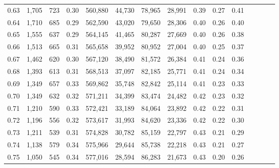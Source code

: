 \begin{tabular}{rrrcrrrrrrrrrrr}
0.63 &   1,705 &     723 &                                       0.30 &  560,880 &   44,730 &   78,965 &   28,991 &  0.39 &  0.27 &                         0.41 \\
0.64 &   1,710 &     685 &                                       0.29 &  562,590 &   43,020 &   79,650 &   28,306 &  0.40 &  0.26 &                         0.40 \\
0.65 &   1,555 &     637 &                                       0.29 &  564,145 &   41,465 &   80,287 &   27,669 &  0.40 &  0.26 &                         0.38 \\
0.66 &   1,513 &     665 &                                       0.31 &  565,658 &   39,952 &   80,952 &   27,004 &  0.40 &  0.25 &                         0.37 \\
0.67 &   1,462 &     620 &                                       0.30 &  567,120 &   38,490 &   81,572 &   26,384 &  0.41 &  0.24 &                         0.36 \\
0.68 &   1,393 &     613 &                                       0.31 &  568,513 &   37,097 &   82,185 &   25,771 &  0.41 &  0.24 &                         0.34 \\
0.69 &   1,349 &     657 &                                       0.33 &  569,862 &   35,748 &   82,842 &   25,114 &  0.41 &  0.23 &                         0.33 \\
0.70 &   1,349 &     632 &                                       0.32 &  571,211 &   34,399 &   83,474 &   24,482 &  0.42 &  0.23 &                         0.32 \\
0.71 &   1,210 &     590 &                                       0.33 &  572,421 &   33,189 &   84,064 &   23,892 &  0.42 &  0.22 &                         0.31 \\
0.72 &   1,196 &     556 &                                       0.32 &  573,617 &   31,993 &   84,620 &   23,336 &  0.42 &  0.22 &                         0.30 \\
0.73 &   1,211 &     539 &                                       0.31 &  574,828 &   30,782 &   85,159 &   22,797 &  0.43 &  0.21 &                         0.29 \\
0.74 &   1,138 &     579 &                                       0.34 &  575,966 &   29,644 &   85,738 &   22,218 &  0.43 &  0.21 &                         0.27 \\
0.75 &   1,050 &     545 &                                       0.34 &  577,016 &   28,594 &   86,283 &   21,673 &  0.43 &  0.20 &                         0.26 \\

\end{tabular}
